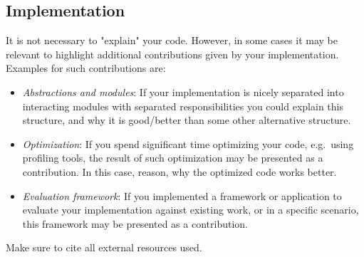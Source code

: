 \subsection{Implementation} It is not necessary to "explain" your code. 
However, in some cases it may be relevant to highlight 
additional contributions given by your implementation.
Examples for such contributions are:
\begin{itemize}
\item \emph{Abstractions and modules}: If your implementation is nicely separated into interacting
modules with separated responsibilities you could explain this structure,
and why it is good/better than some other alternative structure.
\item \emph{Optimization}: If you spend significant time optimizing your code, e.g.~using profiling tools,
the result of such optimization may be presented as a contribution. In this case, reason, 
why the optimized code works better.
\item \emph{Evaluation framework}: If you implemented a framework or application to evaluate your implementation against existing work, or in a specific scenario, this framework may be presented as a contribution.
\end{itemize}

Make sure to cite all external resources used.